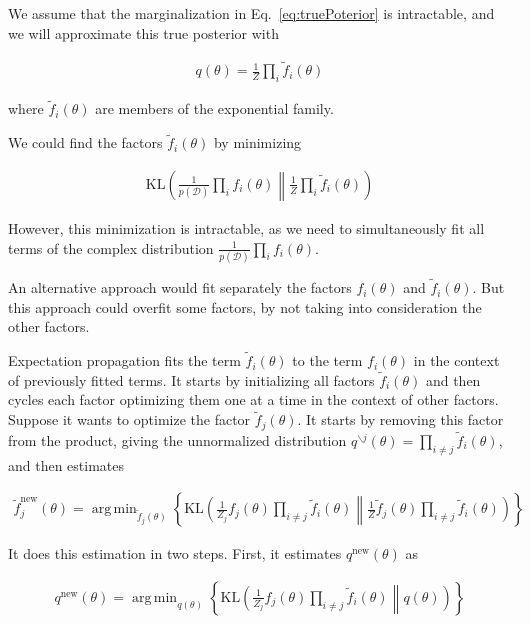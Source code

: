 \documentclass{article}
\DeclareMathOperator*{\argmin}{arg\,min}
\begin{document}
We assume that the marginalization in Eq.~\ref{eq:truePoterior} is intractable,
and we will approximate this true posterior with

\begin{align*}
    q(\theta)=\frac{1}{Z}\prod_i\tilde{f}_i(\theta)
\end{align*}

\noindent where $\tilde{f}_i(\theta)$ are members of the exponential family.

We could find the factors $\tilde{f}_i(\theta)$ by minimizing

\begin{align*}
    \text{KL}\left(\frac{1}{p(\mathcal{D})}\prod_if_i(\theta)\middle\|\frac{1}{Z}\prod_i\tilde{f}_i(\theta)\right)
\end{align*}

However, this minimization is intractable, as we need to simultaneously fit all
terms of the complex distribution $\frac{1}{p(\mathcal{D})}\prod_if_i(\theta)$.

An alternative approach would fit separately the factors $f_i(\theta)$ and
$\tilde{f}_i(\theta)$. But this approach could overfit some factors, by not
taking into consideration the other factors.

Expectation propagation fits the term $\tilde{f}_i(\theta)$ to the term
$f_i(\theta)$ in the context of previously fitted terms. It starts by
initializing all factors $\tilde{f}_i(\theta)$ and then cycles each factor
optimizing them one at a time in the context of other factors. Suppose it wants
to optimize the factor $\tilde{f}_j(\theta)$. It starts by removing this factor
from the product, giving the unnormalized distribution $q^{\backslash
j}(\theta)=\prod_{i\neq j}\tilde{f}_i(\theta)$, and then estimates

\begin{align*}
    \tilde{f}_j^\text{new}(\theta)=\argmin_{\tilde{f}_j(\theta)}\left\{\text{KL}\left(\frac{1}{Z_j}f_j(\theta)\prod_{i\neq j}\tilde{f}_i(\theta)\middle\|\frac{1}{Z}\tilde{f}_j(\theta)\prod_{i\neq j}\tilde{f}_i(\theta)\right)\right\}
\end{align*}

It does this estimation in two steps. First, it estimates $q^\text{new}(\theta)$
as

\begin{align*}
    q^\text{new}(\theta)=\argmin_{q(\theta)}\left\{\text{KL}\left(\frac{1}{Z_j}f_j(\theta)\prod_{i\neq
    j}\tilde{f}_i(\theta)\middle\|q(\theta)\right)\right\}
\end{align*}
\end{document}
